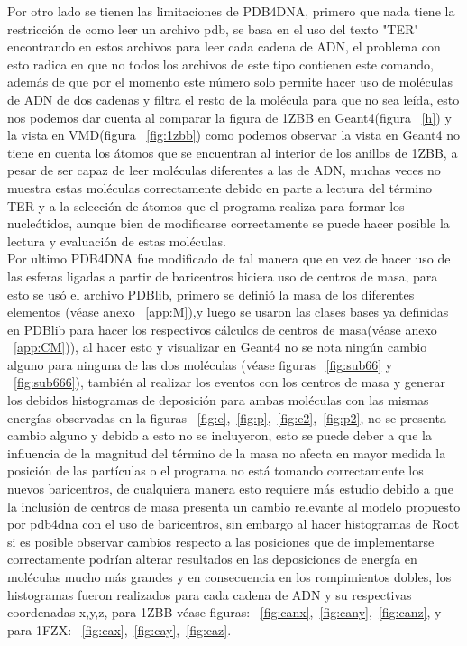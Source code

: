 Por otro lado se tienen las limitaciones de PDB4DNA, primero que nada tiene la restricción de como leer un archivo pdb, se basa en el uso del texto "TER" encontrando en estos archivos para leer cada cadena de ADN, el problema con esto radica en que no todos los archivos de este tipo contienen este comando, además de que por el momento este número solo permite hacer uso de moléculas de ADN de dos cadenas y filtra el resto de la molécula para que no sea leída, esto nos podemos dar cuenta al comparar la figura de 1ZBB en Geant4(figura ~\ref{h}) y la vista en VMD(figura ~\ref{fig:1zbb}) como podemos observar la vista en Geant4 no tiene en cuenta los átomos que se encuentran al interior de los anillos de 1ZBB, a pesar de ser capaz de leer moléculas diferentes a las de ADN, muchas veces no muestra estas moléculas correctamente debido en parte a lectura del término TER y a la selección de átomos que el programa realiza para formar los nucleótidos, aunque bien de modificarse correctamente se puede hacer posible la lectura y evaluación de estas moléculas.\\
Por ultimo PDB4DNA fue modificado de tal manera que en vez de hacer uso de las esferas ligadas a partir de baricentros hiciera uso de centros de masa, para esto se usó el archivo PDBlib, primero se definió la masa de los diferentes elementos (véase anexo ~\ref{app:M}),y luego se usaron las clases bases ya definidas en PDBlib para hacer los respectivos cálculos de centros de masa(véase anexo ~\ref{app:CM})), al hacer esto y visualizar en Geant4 no se nota ningún cambio alguno para ninguna de las dos moléculas (véase figuras ~\ref{fig:sub66} y ~\ref{fig:sub666}), también al realizar los eventos con los centros de masa y generar los debidos histogramas de deposición para ambas moléculas con las mismas energías observadas en la figuras ~\ref{fig:e},~\ref{fig:p},~\ref{fig:e2},~\ref{fig:p2}, no se presenta cambio alguno y debido a esto no se incluyeron, esto se puede deber a que la influencia de la magnitud del término de la masa no afecta en mayor medida la posición de las partículas o el programa no está tomando correctamente los nuevos baricentros, de cualquiera manera esto requiere más estudio debido a que la inclusión de centros de masa presenta un cambio relevante al modelo propuesto por pdb4dna con el uso de baricentros,  sin embargo al hacer histogramas de Root si es posible observar cambios respecto a las posiciones que de implementarse correctamente podrían alterar resultados en las deposiciones de energía en moléculas mucho más grandes y en consecuencia en los rompimientos dobles, los histogramas fueron realizados para cada cadena de ADN y su respectivas coordenadas x,y,z, para 1ZBB véase figuras: ~\ref{fig:canx},~\ref{fig:cany},~\ref{fig:canz}, y para 1FZX: ~\ref{fig:cax},~\ref{fig:cay},~\ref{fig:caz}.





